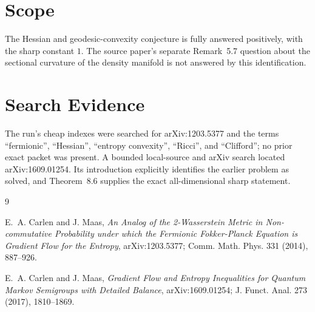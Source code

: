 \documentclass[11pt]{article}
\begin{document}
\section*{Scope}

The Hessian and geodesic-convexity conjecture is fully answered positively,
with the sharp constant \(1\). The source paper's separate Remark~5.7 question
about the sectional curvature of the density manifold is not answered by this
identification.

\section*{Search Evidence}

The run's cheap indexes were searched for arXiv:1203.5377 and the terms
``fermionic'', ``Hessian'', ``entropy convexity'', ``Ricci'', and ``Clifford'';
no prior exact packet was present. A bounded local-source and arXiv search
located arXiv:1609.01254. Its introduction explicitly identifies the earlier
problem as solved, and Theorem~8.6 supplies the exact all-dimensional sharp
statement.

\begin{thebibliography}{9}

E.~A. Carlen and J. Maas,
\emph{An Analog of the 2-Wasserstein Metric in Non-commutative Probability
under which the Fermionic Fokker-Planck Equation is Gradient Flow for the
Entropy}, arXiv:1203.5377; Comm. Math. Phys. 331 (2014), 887--926.

E.~A. Carlen and J. Maas,
\emph{Gradient Flow and Entropy Inequalities for Quantum Markov Semigroups
with Detailed Balance}, arXiv:1609.01254; J. Funct. Anal. 273 (2017),
1810--1869.

\end{thebibliography}
\end{document}
